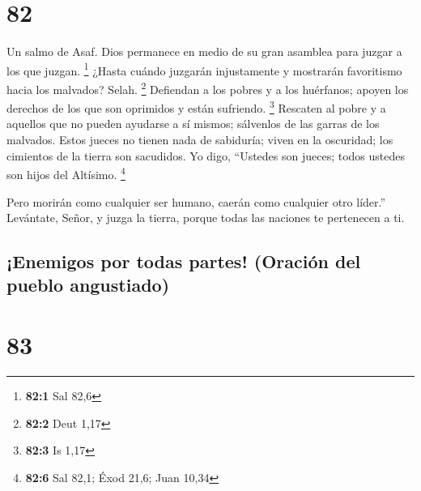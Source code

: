 \hypertarget{section-81}{%
\section{82}\label{section-81}}

Un salmo de Asaf.  Dios permanece en medio de su gran
asamblea para juzgar a los que juzgan. \footnote{\textbf{82:1} Sal 82,6}
 ¿Hasta cuándo juzgarán injustamente y mostrarán favoritismo
hacia los malvados? Selah. \footnote{\textbf{82:2} Deut 1,17}
 Defiendan a los pobres y a los huérfanos; apoyen los
derechos de los que son oprimidos y están sufriendo. \footnote{\textbf{82:3}
  Is 1,17}  Rescaten al pobre y a aquellos que no pueden
ayudarse a sí mismos; sálvenlos de las garras de los malvados.
 Estos jueces no tienen nada de sabiduría; viven en la
oscuridad; los cimientos de la tierra son sacudidos.  Yo
digo, ``Ustedes son jueces; todos ustedes son hijos del Altísimo.
\footnote{\textbf{82:6} Sal 82,1; Éxod 21,6; Juan 10,34}

 Pero morirán como cualquier ser humano, caerán como
cualquier otro líder.''  Levántate, Señor, y juzga la
tierra, porque todas las naciones te pertenecen a ti.

\hypertarget{enemigos-por-todas-partes-oraciuxf3n-del-pueblo-angustiado}{%
\subsection{¡Enemigos por todas partes! (Oración del pueblo
angustiado)}\label{enemigos-por-todas-partes-oraciuxf3n-del-pueblo-angustiado}}

\hypertarget{section-82}{%
\section{83}\label{section-82}}

